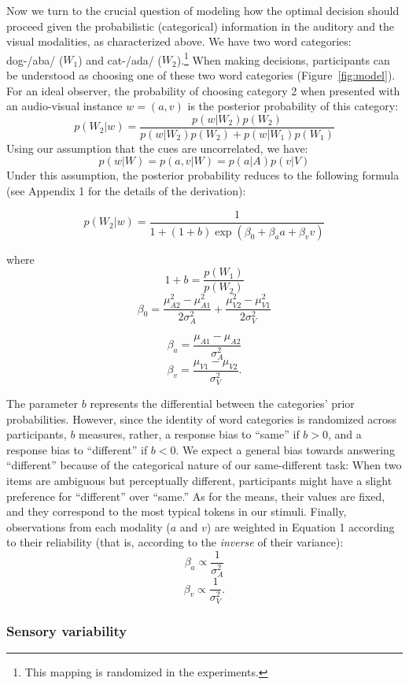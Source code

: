 \documentclass[english,,man,floatsintext]{apa6}
\let\rmarkdownfootnote\footnote%
\def\footnote{\protect\rmarkdownfootnote}
\theoremstyle{definition}
\theoremstyle{definition}
\theoremstyle{definition}
\theoremstyle{remark}
\begin{document}
Now we turn to the crucial question of modeling how the optimal decision
should proceed given the probabilistic (categorical) information in the
auditory and the visual modalities, as characterized above. We have two
word categories: dog-/aba/ (\(W_1\)) and cat-/ada/
(\(W_2\)).\footnote{This mapping is randomized in the experiments.} When
making decisions, participants can be understood as choosing one of
these two word categories (Figure~\ref{fig:model}). For an ideal
observer, the probability of choosing category 2 when presented with an
audio-visual instance \(w=(a,v)\) is the posterior probability of this
category: \[
p(W_2 | w)=\frac{p(w|W_2)p(W_2)}{p(w|W_2)p(W_2)+p(w|W_1)p(W_1)}
\] Using our assumption that the cues are uncorrelated, we have:
\[p(w | W) = p(a,v| W) = p(a| A)p(v| V)\] Under this assumption, the
posterior probability reduces to the following formula (see Appendix 1
for the details of the derivation):

\begin{equation}
 p(W_2 | w)=\frac{1}{1+(1+b)\exp(\beta_0+\beta_aa+\beta_vv)}
\end{equation}

where \[1+b=\frac{p(W_1)}{p(W_2)}\]
\[\beta_0=\frac{\mu^2_{A2}-\mu^2_{A1}}{2\sigma^2_{A}}+\frac{\mu^2_{V2}-\mu^2_{V1}}{2\sigma^2_{V}}\]

\[\beta_a=\frac{\mu_{A1}-\mu_{A2}}{\sigma^2_{A}}\]
\[\beta_v=\frac{\mu_{V1}-\mu_{V2}}{\sigma^2_{V}}.\]

The parameter \(b\) represents the differential between the categories'
prior probabilities. However, since the identity of word categories is
randomized across participants, \(b\) measures, rather, a response bias
to \enquote{same} if \(b > 0\), and a response bias to
\enquote{different} if \(b < 0\). We expect a general bias towards
answering \enquote{different} because of the categorical nature of our
same-different task: When two items are ambiguous but perceptually
different, participants might have a slight preference for
\enquote{different} over \enquote{same.} As for the means, their values
are fixed, and they correspond to the most typical tokens in our
stimuli. Finally, observations from each modality (\(a\) and \(v\)) are
weighted in Equation 1 according to their reliability (that is,
according to the \emph{inverse} of their variance):
\[\beta_a \propto \frac{1}{\sigma^2_{A}}\]
\[\beta_v \propto \frac{1}{\sigma^2_{V}}.\]

\subsubsection{Sensory variability}\label{sensory-variability}
\end{document}
